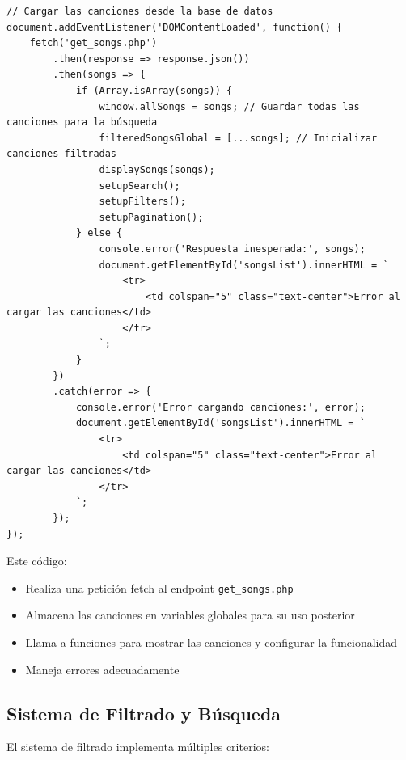 \documentclass[a4paper,12pt]{article}
\begin{document}
\begin{verbatim}
// Cargar las canciones desde la base de datos
document.addEventListener('DOMContentLoaded', function() {
    fetch('get_songs.php')
        .then(response => response.json())
        .then(songs => {
            if (Array.isArray(songs)) {
                window.allSongs = songs; // Guardar todas las canciones para la búsqueda
                filteredSongsGlobal = [...songs]; // Inicializar canciones filtradas
                displaySongs(songs);
                setupSearch();
                setupFilters();
                setupPagination();
            } else {
                console.error('Respuesta inesperada:', songs);
                document.getElementById('songsList').innerHTML = `
                    <tr>
                        <td colspan="5" class="text-center">Error al cargar las canciones</td>
                    </tr>
                `;
            }
        })
        .catch(error => {
            console.error('Error cargando canciones:', error);
            document.getElementById('songsList').innerHTML = `
                <tr>
                    <td colspan="5" class="text-center">Error al cargar las canciones</td>
                </tr>
            `;
        });
});
\end{verbatim}

Este código:
\begin{itemize}
    \item Realiza una petición fetch al endpoint \texttt{get\_songs.php}
    \item Almacena las canciones en variables globales para su uso posterior
    \item Llama a funciones para mostrar las canciones y configurar la funcionalidad
    \item Maneja errores adecuadamente
\end{itemize}

\subsection{Sistema de Filtrado y Búsqueda}
El sistema de filtrado implementa múltiples criterios:
\end{document}
